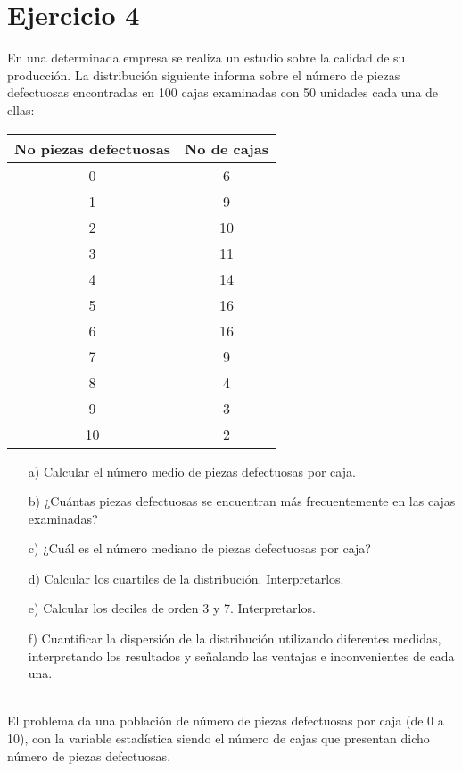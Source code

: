 \documentclass[a4paper,12pt]{article}
\begin{document}
\section*{Ejercicio 4}
En una determinada empresa se realiza un estudio sobre la calidad de su producción. La distribución siguiente informa sobre el número de piezas defectuosas encontradas en 100 cajas examinadas con 50 unidades cada una de ellas:

\begin{center}
    \begin{tabular}{|c|c|}
        \hline
        No piezas defectuosas & No de cajas \\
        \hline
        0 & 6 \\
        1 & 9 \\
        2 & 10 \\
        3 & 11 \\
        4 & 14 \\
        5 & 16 \\
        6 & 16 \\
        7 & 9 \\
        8 & 4 \\
        9 & 3 \\
        10 & 2 \\
        \hline
    \end{tabular}
\end{center}

\begin{itemize}
    \item[a)] Calcular el número medio de piezas defectuosas por caja.
    \item[b)] ¿Cuántas piezas defectuosas se encuentran más frecuentemente en las cajas examinadas?
    \item[c)] ¿Cuál es el número mediano de piezas defectuosas por caja?
    \item[d)] Calcular los cuartiles de la distribución. Interpretarlos.
    \item[e)] Calcular los deciles de orden 3 y 7. Interpretarlos.
    \item[f)] Cuantificar la dispersión de la distribución utilizando diferentes medidas, interpretando los resultados y señalando las ventajas e inconvenientes de cada una.
\end{itemize}

\\El problema da una población de número de piezas defectuosas por caja (de 0 a 10), con la variable estadística siendo el número de cajas que presentan dicho número de piezas defectuosas.\\
\end{document}
